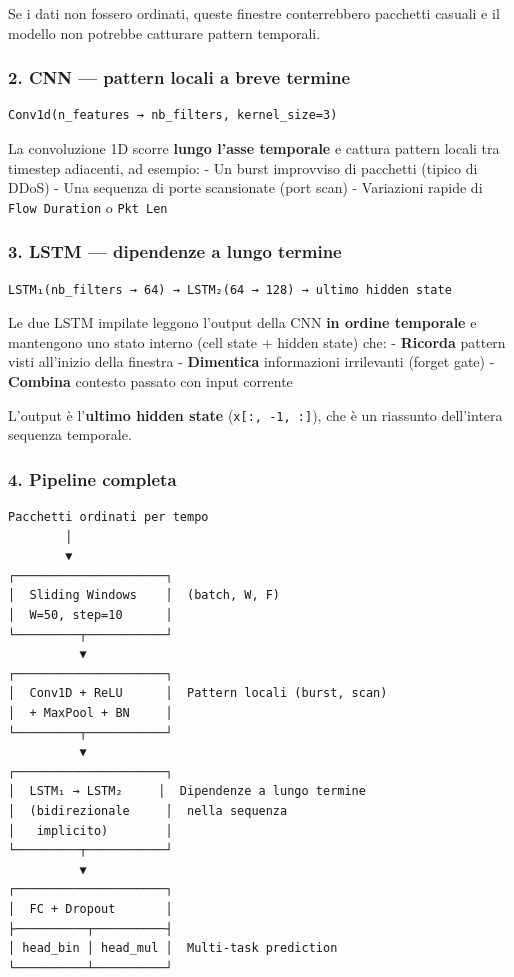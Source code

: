 Se i dati non fossero ordinati, queste finestre conterrebbero pacchetti casuali e il modello non potrebbe catturare pattern temporali.

\subsubsection{2. CNN --- pattern locali a breve termine}\label{cnn-pattern-locali-a-breve-termine}

\begin{verbatim}
Conv1d(n_features → nb_filters, kernel_size=3)
\end{verbatim}

La convoluzione 1D scorre \textbf{lungo l'asse temporale} e cattura pattern locali tra timestep adiacenti, ad esempio: - Un burst improvviso di pacchetti (tipico di DDoS) - Una sequenza di porte scansionate (port scan) - Variazioni rapide di \texttt{Flow\ Duration} o \texttt{Pkt\ Len}

\subsubsection{3. LSTM --- dipendenze a lungo termine}\label{lstm-dipendenze-a-lungo-termine}

\begin{verbatim}
LSTM₁(nb_filters → 64) → LSTM₂(64 → 128) → ultimo hidden state
\end{verbatim}

Le due LSTM impilate leggono l'output della CNN \textbf{in ordine temporale} e mantengono uno stato interno (cell state + hidden state) che: - \textbf{Ricorda} pattern visti all'inizio della finestra - \textbf{Dimentica} informazioni irrilevanti (forget gate) - \textbf{Combina} contesto passato con input corrente

L'output è l'\textbf{ultimo hidden state} (\texttt{x{[}:,\ -1,\ :{]}}), che è un riassunto dell'intera sequenza temporale.

\subsubsection{4. Pipeline completa}\label{pipeline-completa}

\begin{verbatim}
Pacchetti ordinati per tempo
        │
        ▼
┌─────────────────────┐
│  Sliding Windows    │  (batch, W, F)
│  W=50, step=10      │
└─────────┬───────────┘
          ▼
┌─────────────────────┐
│  Conv1D + ReLU      │  Pattern locali (burst, scan)
│  + MaxPool + BN     │
└─────────┬───────────┘
          ▼
┌─────────────────────┐
│  LSTM₁ → LSTM₂     │  Dipendenze a lungo termine
│  (bidirezionale     │  nella sequenza
│   implicito)        │
└─────────┬───────────┘
          ▼
┌─────────────────────┐
│  FC + Dropout       │
├──────────┬──────────┤
│ head_bin │ head_mul │  Multi-task prediction
└──────────┴──────────┘
\end{verbatim}

